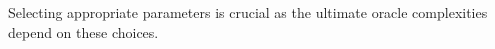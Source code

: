 

Selecting appropriate parameters is crucial as the ultimate oracle complexities depend on these choices.
